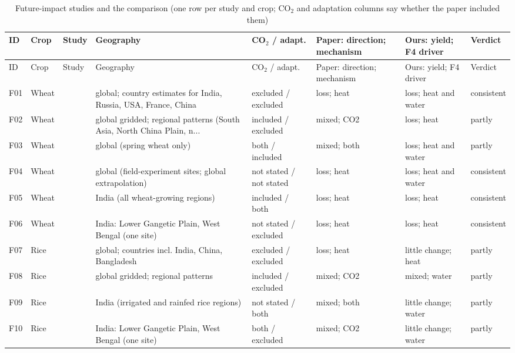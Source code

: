 \begin{longtable}{@{}p{0.7cm}p{1.5cm}>{\raggedright\arraybackslash}p{2.0cm}>{\raggedright\arraybackslash}p{2.9cm}>{\raggedright\arraybackslash}p{1.9cm}>{\raggedright\arraybackslash}p{2.0cm}>{\raggedright\arraybackslash}p{2.0cm}p{1.3cm}@{}}
\caption{Future-impact studies and the comparison (one row per study and crop; CO$_2$ and adaptation columns say whether the paper included them)}\label{tab:litrows}\\
\toprule
ID & Crop & Study & Geography & CO$_2$ / adapt. & Paper: direction; mechanism & Ours: yield; F4 driver & Verdict \\
\midrule
\endfirsthead
\toprule
ID & Crop & Study & Geography & CO$_2$ / adapt. & Paper: direction; mechanism & Ours: yield; F4 driver & Verdict \\
\midrule
\endhead
\bottomrule
\endfoot
F01 & Wheat & \citet{zhao2017} & global; country estimates for India, Russia, USA, France, China & excluded / excluded & loss; heat & loss; heat and water & consistent \\
F02 & Wheat & \citet{jagermeyr2021} & global gridded; regional patterns (South Asia, North China Plain, n... & included / excluded & mixed; CO2 & loss; heat & partly \\
F03 & Wheat & \citet{deryng2014} & global (spring wheat only) & both / included & mixed; both & loss; heat and water & partly \\
F04 & Wheat & \citet{asseng2015} & global (field-experiment sites; global extrapolation) & not stated / not stated & loss; heat & loss; heat and water & consistent \\
F05 & Wheat & \citet{nareshkumar2014wheat} & India (all wheat-growing regions) & included / both & loss; heat & loss; heat & consistent \\
F06 & Wheat & \citet{chandran2023} & India: Lower Gangetic Plain, West Bengal (one site) & not stated / excluded & loss; heat & loss; heat & consistent \\
F07 & Rice & \citet{zhao2017} & global; countries incl. India, China, Bangladesh & excluded / excluded & loss; heat & little change; heat & partly \\
F08 & Rice & \citet{jagermeyr2021} & global gridded; regional patterns & included / excluded & mixed; CO2 & mixed; water & partly \\
F09 & Rice & \citet{soora2013} & India (irrigated and rainfed rice regions) & not stated / both & mixed; both & little change; water & partly \\
F10 & Rice & \citet{chandran2023} & India: Lower Gangetic Plain, West Bengal (one site) & both / excluded & mixed; CO2 & little change; water & partly \\

\end{longtable}
